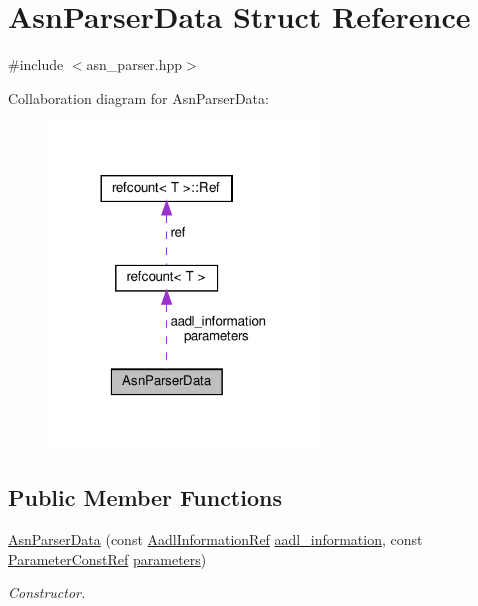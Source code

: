 \hypertarget{structAsnParserData}{}\section{Asn\+Parser\+Data Struct Reference}
\label{structAsnParserData}


{\ttfamily \#include $<$asn\+\_\+parser.\+hpp$>$}



Collaboration diagram for Asn\+Parser\+Data\+:
\nopagebreak
\begin{figure}[H]
\begin{center}
\leavevmode
\includegraphics[width=204pt]{d1/d25/structAsnParserData__coll__graph}
\end{center}
\end{figure}
\subsection*{Public Member Functions}
\begin{DoxyCompactItemize}
\item 
\hyperlink{structAsnParserData_af3b55b2373eb5bb6e36b1b33f672b0c8}{Asn\+Parser\+Data} (const \hyperlink{aadl__information_8hpp_ad2aa3a9df7fbf64760e8fc1a5e7b9b3e}{Aadl\+Information\+Ref} \hyperlink{structAsnParserData_ae22aa0389c4544b1b987c0597cb72930}{aadl\+\_\+information}, const \hyperlink{Parameter_8hpp_a37841774a6fcb479b597fdf8955eb4ea}{Parameter\+Const\+Ref} \hyperlink{structAsnParserData_ac25a39d9cca4361a71ed73e4d1ba6955}{parameters})
\begin{DoxyCompactList}\small\item\em Constructor. \end{DoxyCompactList}\end{DoxyCompactItemize}
